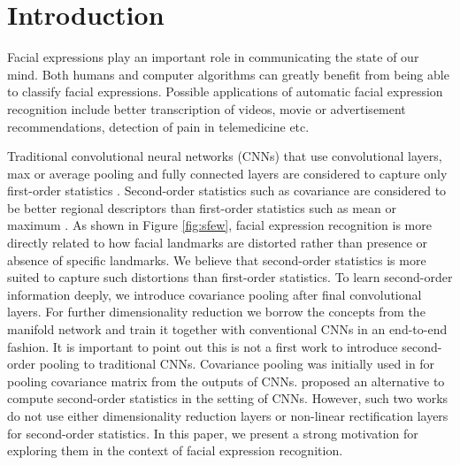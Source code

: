 \documentclass[10pt,twocolumn,letterpaper]{article}
\begin{document}
\section{Introduction}
Facial expressions play an important role in communicating the state of our mind. Both humans and computer algorithms can greatly benefit from being able to classify facial expressions. Possible applications of automatic facial expression recognition include better transcription of videos, movie or advertisement recommendations, detection of pain in telemedicine etc.

Traditional convolutional neural networks (CNNs) that use convolutional layers, max or average pooling and fully connected layers are considered to capture only first-order statistics \cite{epfl}. Second-order statistics such as covariance are considered to be better regional descriptors than first-order statistics such as mean or maximum \cite{cdu}. As shown in Figure \ref{fig:sfew}, facial expression recognition is more directly related to how facial landmarks are distorted rather than presence or absence of specific landmarks. We believe that second-order statistics is more suited to capture such distortions than first-order statistics. To learn second-order information deeply, we introduce covariance pooling after final convolutional layers. For further dimensionality reduction we borrow the concepts from the manifold network \cite{spdnet} and train it together with conventional CNNs in an end-to-end fashion. It is important to point out this is not a first work to introduce second-order pooling to traditional CNNs. Covariance pooling was initially used in \cite{mbprop} for pooling covariance matrix from the outputs of CNNs. \cite{epfl} proposed an alternative to compute second-order statistics in the setting of CNNs. However, such two works do not use either dimensionality reduction layers or non-linear rectification layers for second-order statistics. In this paper, we present a strong motivation for exploring them in the context of facial expression recognition.
	
\end{document}
